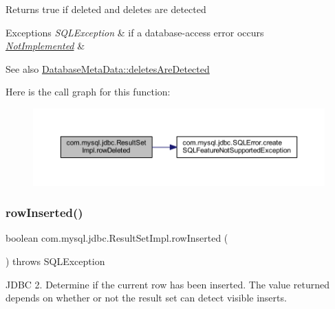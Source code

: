 \begin{DoxyReturn}{Returns}
true if deleted and deletes are detected
\end{DoxyReturn}

\begin{DoxyExceptions}{Exceptions}
{\em S\+Q\+L\+Exception} & if a database-\/access error occurs \\
\hline
{\em \mbox{\hyperlink{classcom_1_1mysql_1_1jdbc_1_1_not_implemented}{Not\+Implemented}}} & \\
\hline
\end{DoxyExceptions}
\begin{DoxySeeAlso}{See also}
\mbox{\hyperlink{classcom_1_1mysql_1_1jdbc_1_1_database_meta_data_a2285b39a35023c91168afdebbfd4e935}{Database\+Meta\+Data\+::deletes\+Are\+Detected}} 
\end{DoxySeeAlso}
Here is the call graph for this function\+:
\nopagebreak
\begin{figure}[H]
\begin{center}
\leavevmode
\includegraphics[width=350pt]{classcom_1_1mysql_1_1jdbc_1_1_result_set_impl_a1b064fbd329b324c8acac4a7ef61d4b4_cgraph}
\end{center}
\end{figure}
\mbox{\label{classcom_1_1mysql_1_1jdbc_1_1_result_set_impl_affa56f32911dd7a8e11cb24b17afc125}} 
\subsubsection{\texorpdfstring{row\+Inserted()}{rowInserted()}}
{\footnotesize\ttfamily boolean com.\+mysql.\+jdbc.\+Result\+Set\+Impl.\+row\+Inserted (\begin{DoxyParamCaption}{ }\end{DoxyParamCaption}) throws S\+Q\+L\+Exception}

J\+D\+BC 2. Determine if the current row has been inserted. The value returned depends on whether or not the result set can detect visible inserts.

